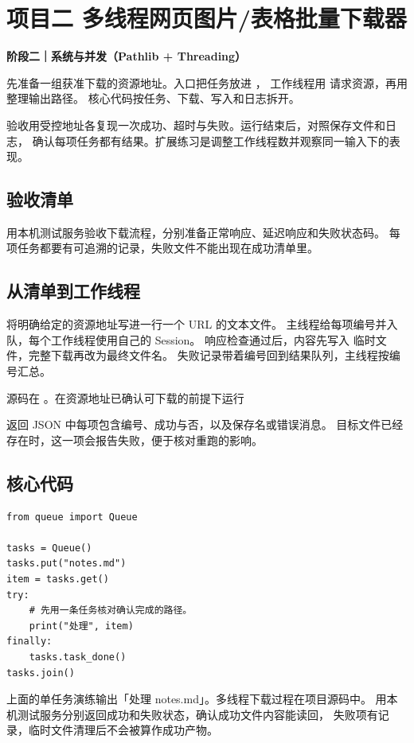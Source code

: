 \chapter*{项目二 多线程网页图片/表格批量下载器}

\textbf{阶段二｜系统与并发（Pathlib + Threading）}

先准备一组获准下载的资源地址。入口把任务放进 ，
工作线程用  请求资源，再用  整理输出路径。
核心代码按任务、下载、写入和日志拆开。

验收用受控地址各复现一次成功、超时与失败。运行结束后，对照保存文件和日志，
确认每项任务都有结果。扩展练习是调整工作线程数并观察同一输入下的表现。

\section*{验收清单}
用本机测试服务验收下载流程，分别准备正常响应、延迟响应和失败状态码。
每项任务都要有可追溯的记录，失败文件不能出现在成功清单里。

\section*{从清单到工作线程}
将明确给定的资源地址写进一行一个 URL 的文本文件。
主线程给每项编号并入队，每个工作线程使用自己的 Session。
响应检查通过后，内容先写入  临时文件，完整下载再改为最终文件名。
失败记录带着编号回到结果队列，主线程按编号汇总。

源码在 。在资源地址已确认可下载的前提下运行
\par\noindent{}\par 
返回 JSON 中每项包含编号、成功与否，以及保存名或错误消息。
目标文件已经存在时，这一项会报告失败，便于核对重跑的影响。

\section*{核心代码}
\begin{lstlisting}[title={\code{download.py 中的任务收尾}}]
from queue import Queue

tasks = Queue()
tasks.put("notes.md")
item = tasks.get()
try:
    # 先用一条任务核对确认完成的路径。
    print("处理", item)
finally:
    tasks.task_done()
tasks.join()
\end{lstlisting}
上面的单任务演练输出「处理 notes.md」。多线程下载过程在项目源码中。
用本机测试服务分别返回成功和失败状态，确认成功文件内容能读回，
失败项有记录，临时文件清理后不会被算作成功产物。

